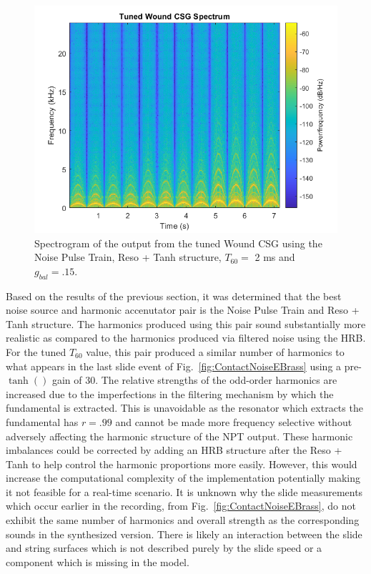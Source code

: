 \documentclass[../main.tex]{subfiles}
\begin{document}
\begin{figure}[h]
    \centering
    \includegraphics[scale=.65]{./images/plots/TunedWoundCSG.png}
    \caption{Spectrogram of the output from the tuned Wound CSG using the Noise Pulse Train, Reso + Tanh structure, $T_{60} = $ 2 ms and $g_{bal} = .15$.}
    \label{fig:TunedWoundCSG}
\end{figure}

Based on the results of the previous section, it was determined that the best noise source and harmonic accenutator pair is the Noise Pulse Train and Reso + Tanh structure. The harmonics produced using this pair sound substantially more realistic as compared to the harmonics produced via filtered noise using the HRB. For the tuned $T_{60}$ value, this pair produced a similar number of harmonics to what appears in the last slide event of Fig.~\ref{fig:ContactNoiseEBrass} using a pre-$\tanh()$ gain of 30. The relative strengths of the odd-order harmonics are increased due to the imperfections in the filtering mechanism by which the fundamental is extracted. This is unavoidable as the resonator which extracts the fundamental has $r = .99$ and cannot be made more frequency selective without adversely affecting the harmonic structure of the NPT output. These harmonic imbalances could be corrected by adding an HRB structure after the Reso + Tanh to help control the harmonic proportions more easily. However, this would increase the computational complexity of the implementation potentially making it not feasible for a real-time scenario. It is unknown why the slide measurements which occur earlier in the recording, from Fig.~\ref{fig:ContactNoiseEBrass}, do not exhibit the same number of harmonics and overall strength as the corresponding sounds in the synthesized version. There is likely an interaction between the slide and string surfaces which is not described purely by the slide speed or a component which is missing in the model.
\end{document}
